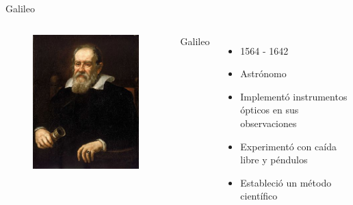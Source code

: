 \documentclass{beamer}
\begin{document}
\begin{frame}{Galileo}
\begin{columns}
\begin{figure}
 \centering
 \includegraphics[scale=2.5]{Imagenes/Galileo}
 \end{figure}
 \begin{center}
 \small
 Galileo  
 \end{center}
\begin{itemize}
 \item 1564 - 1642 
 \item Astrónomo 
 \item Implementó instrumentos ópticos en sus observaciones  
 \item Experimentó con caída libre y péndulos 
 \item Estableció un método científico 
\end{itemize}
\end{columns}
\end{frame}

\end{document}
